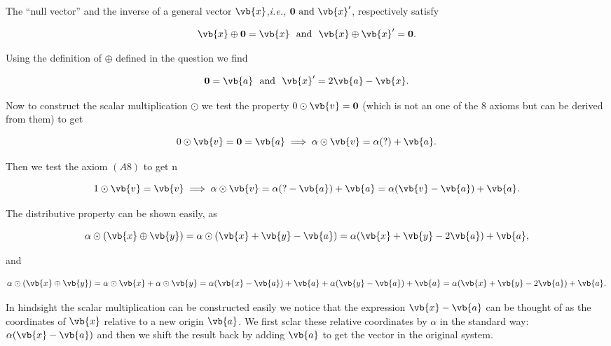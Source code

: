 \documentclass[a4paper,12pt]{report}
\begin{document}
{The ``null vector'' and the inverse of a general vector \(\vb{x} \),\textit{i.e.,} \(\boldsymbol{0} \text { and } \vb{x} '\), respectively satisfy

\begin{equation}
    \vb{x} \oplus \boldsymbol{0} = \vb{x} ~\text { and }~ \vb{x} \oplus \vb{x} ' = \boldsymbol{0}. 
\end{equation}

Using the definition of \(\oplus\) defined in the question we find 

\begin{equation}
    \boldsymbol{0} = \vb{a} ~\text { and }~ \vb{x} ' = 2\vb{a} -\vb{x}  .
\end{equation}

Now to construct the scalar multiplication \(\odot\) we test the property \(0 \odot \vb{v} = \boldsymbol{0} \) (which is not an one of the 8 axioms but can be derived from them) to get 

\begin{equation}
    0 \odot \vb{v} = \boldsymbol{0} = \vb{a} \implies \alpha \odot \vb{v} = \alpha (?) + \vb{a} .
\end{equation}

Then we test the axiom \((A8)\) to get n

\begin{equation}
    1 \odot \vb{v} = \vb{v} \implies \alpha \odot \vb{v} = \alpha (?- \vb{a} ) + \vb{a} = \alpha (\vb{v} -\vb{a} )+ \vb{a} .
\end{equation}

The distributive property can be shown easily, as 

\begin{equation}
    \alpha \odot(\vb{x} \oplus \vb{y} ) = \alpha \odot (\vb{x} +\vb{y} -\vb{a} ) = \alpha (\vb{x} +\vb{y} -2\vb{a} )+\vb{a} ,
\end{equation}

and 

\begin{equation}
    \alpha \odot (\vb{x} \oplus \vb{y} ) = \alpha \odot \vb{x} + \alpha \odot\vb{y} = \alpha (\vb{x} -\vb{a} ) + \vb{a} + \alpha (\vb{y} -\vb{a} ) + \vb{a} = \alpha (\vb{x} +\vb{y} -2\vb{a} ) + \vb{a}.
\end{equation}

In hindsight the scalar multiplication can be constructed easily we notice that the expression \(\vb{x} -\vb{a} \) can be thought of as the coordinates of \(\vb{x} \) relative to a new origin \(\vb{a} \). We first sclar these relative coordinates by \(\alpha \) in the standard way: \(\alpha (\vb{x} -\vb{a} )\) and then we shift the result back by adding \(\vb{a} \) to get the vector in the original system.      
} 
\end{document}
